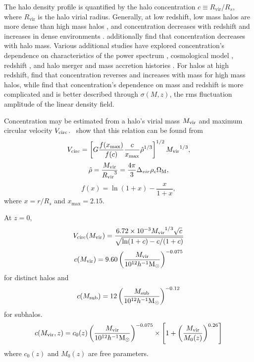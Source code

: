 The halo density profile is quantified by the halo concentration $c \equiv R_{\mathrm{vir}} / R_{s}$, where $R_{\mathrm{vir}}$ is the halo virial radius.  Generally, at low redshift, low mass halos are more dense than high mass halos \citep{1997ApJ...490..493N}, and concentration decreases with redshift and increases in dense environments \citep{2001MNRAS.321..559B}.  \citet{2007MNRAS.381.1450N} additionally find that concentration decreases with halo mass.  Various additional studies have explored concentration's dependence on characteristics of the power spectrum \citep{2001ApJ...554..114E}, cosmological model \citep{2008MNRAS.391.1940M}, redshift \citep{2008MNRAS.387..536G, 2011MNRAS.411..584M}, and halo merger and mass accretion histories \citep{2002ApJ...568...52W, 2003MNRAS.339...12Z, 2009ApJ...707..354Z}.  For halos at high redshift, \citet{2011ApJ...740..102K} find that concentration reverses and increases with mass for high mass halos, while \citet{2012MNRAS.423.3018P} find that concentration's dependence on mass and redshift is more complicated and is better described through $\sigma(M,z)$, the rms fluctuation amplitude of the linear density field.

Concentration may be estimated from a halo's virial mass ${M_{\mathrm{vir}}}$ and maximum circular velocity ${V_{\mathrm{circ}}}$.  \cn\ show that this relation can be found from
\begin{equation}
	{V_{\mathrm{circ}}} = \left[ G \frac{f(x_{\max})}{f(c)} \frac{c}{x_{\max}} \hat{\rho}^{1/3} \right]^{1/2} {M_{\mathrm{vir}}}^{1/3},
\end{equation}
\begin{equation}
	\hat{\rho} = \frac{{M_{\mathrm{vir}}}}{{R_{\mathrm{vir}}}^{3}} = \frac{4 \pi}{3} \Delta_{vir} \rho_{c} \Omega_{\mathrm{M}},
\end{equation}
\begin{equation}
	f(x) = \ln(1 + x) - \frac{x}{1 + x},
\end{equation}
where $x = r / R_{s}$ and $x_{\max} = 2.15$.

At $z = 0$,
\begin{equation}
	{V_{\mathrm{circ}}}({M_{\mathrm{vir}}}) = \frac{6.72 \times 10^{-3} {M_{\mathrm{vir}}}^{1/3} \sqrt{c}}{\sqrt{\ln(1 + c) - c / (1 + c)}}
\end{equation}
\begin{equation}
	c({M_{\mathrm{vir}}}) = 9.60 \left( \frac{{M_{\mathrm{vir}}}}{10^{12} h^{-1} {\rm M_\odot}} \right)^{-0.075}
\end{equation}
for distinct halos and
\begin{equation}
	c(M_{\mathrm{sub}}) = 12 \left( \frac{M_{\mathrm{sub}}}{10^{12} h^{-1} {\rm M_\odot}} \right)^{-0.12}
\end{equation}
for subhalos.
\begin{equation}
	c({M_{\mathrm{vir}}},z) = c_{0}(z) \left( \frac{{M_{\mathrm{vir}}}}{10^{12} h^{-1} {\rm M_\odot}} \right)^{-0.075} \times \left[ 1 + \left( \frac{{M_{\mathrm{vir}}}}{M_{0}(z)} \right)^{0.26} \right]
\end{equation}
where $c_{0}(z)$ and $M_{0}(z)$ are free parameters.

